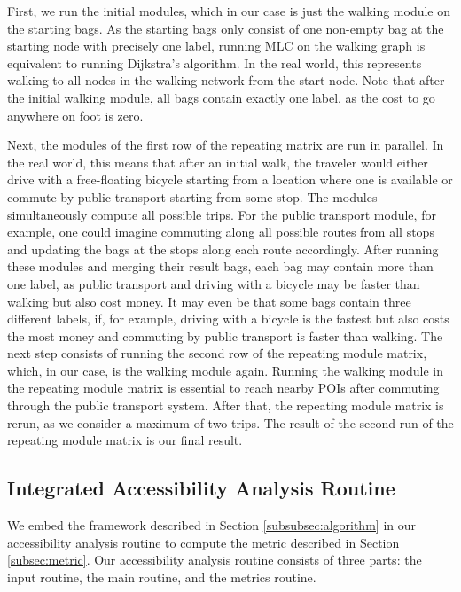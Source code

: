 First, we run the initial modules, which in our case is just the walking module on the starting bags.
As the starting bags only consist of one non-empty bag at the starting node with precisely one label, running MLC on the walking graph is equivalent to running Dijkstra's algorithm.
In the real world, this represents walking to all nodes in the walking network from the start node.
Note that after the initial walking module, all bags contain exactly one label, as the cost to go anywhere on foot is zero.

Next, the modules of the first row of the repeating matrix are run in parallel.
In the real world, this means that after an initial walk, the traveler would either drive with a free-floating bicycle starting from a location where one is available or commute by public transport starting from some stop.
The modules simultaneously compute all possible trips.
For the public transport module, for example, one could imagine commuting along all possible routes from all stops and updating the bags at the stops along each route accordingly.
After running these modules and merging their result bags, each bag may contain more than one label, as public transport and driving with a bicycle may be faster than walking but also cost money.
It may even be that some bags contain three different labels, if, for example, driving with a bicycle is the fastest but also costs the most money and commuting by public transport is faster than walking.
The next step consists of running the second row of the repeating module matrix, which, in our case, is the walking module again.
Running the walking module in the repeating module matrix is essential to reach nearby POIs after commuting through the public transport system.
After that, the repeating module matrix is rerun, as we consider a maximum of two trips.
The result of the second run of the repeating module matrix is our final result.

\subsection{Integrated Accessibility Analysis Routine}
\label{subsec:combining}

We embed the framework described in Section \ref{subsubsec:algorithm} in our accessibility analysis routine to compute the metric described in Section \ref{subsec:metric}.
Our accessibility analysis routine consists of three parts: the input routine, the main routine, and the metrics routine.

